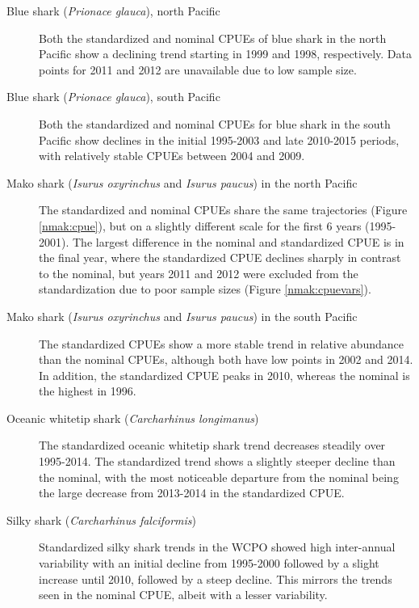 \begin{description}
\item[Blue shark (\emph{Prionace glauca}), north Pacific] Both the standardized and nominal CPUEs of blue shark in the north Pacific show a declining trend starting in 1999 and 1998, respectively. Data points for 2011 and 2012 are unavailable due to low sample size.  
 
 \item[Blue shark (\emph{Prionace glauca}), south Pacific]  Both the standardized and nominal CPUEs for blue shark in the south Pacific show declines in the initial 1995-2003 and late 2010-2015 periods, with relatively stable CPUEs between 2004  and 2009.  
 
 \item[Mako shark (\emph{Isurus oxyrinchus} and \emph{Isurus paucus}) in the north Pacific] The standardized and nominal CPUEs share the same trajectories (Figure \ref{nmak:cpue}), but on a slightly different scale for the first 6 years (1995-2001).  The largest difference in the nominal and standardized CPUE is in the final year, where the standardized CPUE declines sharply in contrast to the nominal, but years 2011 and 2012 were excluded from the standardization due to poor sample sizes (Figure \ref{nmak:cpuevars}).
 
\item[Mako shark (\emph{Isurus oxyrinchus} and \emph{Isurus paucus}) in the south Pacific] The standardized CPUEs show a more stable trend in relative abundance than the nominal CPUEs, although both have low points in 2002 and 2014. In addition, the standardized CPUE peaks in 2010, whereas the nominal is the highest in 1996.  
 
\item[Oceanic whitetip shark (\emph{Carcharhinus longimanus})] The standardized oceanic whitetip shark trend decreases steadily over 1995-2014.  The standardized trend shows a slightly steeper decline than the nominal, with the most noticeable departure from the nominal being the large decrease from 2013-2014 in the standardized CPUE.%
 
 \item[Silky shark (\emph{Carcharhinus falciformis})] Standardized silky shark trends in the WCPO showed high inter-annual variability with an initial decline from 1995-2000 followed by a slight increase until 2010, followed by a steep decline. This mirrors the trends seen in the nominal CPUE, albeit with a lesser variability.
 

\end{description}
